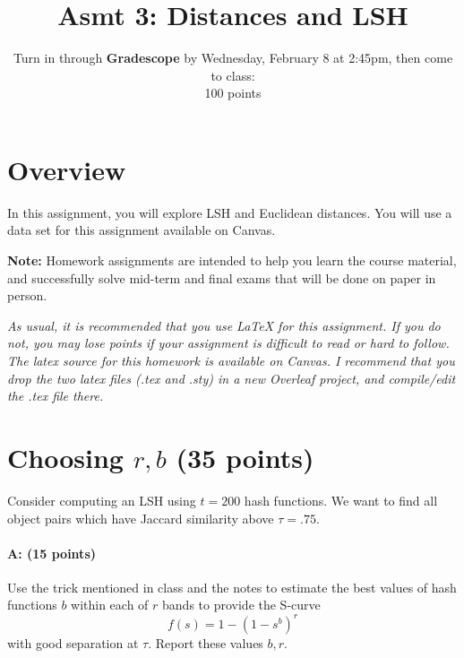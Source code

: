 \documentclass[11pt]{article}
\title{Asmt 3: Distances and LSH}
\author{Turn in through \textbf{Gradescope} by Wednesday, February 8 at 2:45pm, then come to class: \\
100 points}
\date{}
\begin{document}
\maketitle





\section*{Overview}

In this assignment, you will explore LSH and Euclidean distances. You will use a data set for this assignment available on Canvas. 

\vspace{.1in}

\textbf{Note:} Homework assignments are intended to help you learn the course material, and successfully solve mid-term and final exams that will be done on paper in person.   

\vspace{.1in}

\emph{As usual, it is recommended that you use LaTeX for this assignment.  If you do not, you may lose points if your assignment is difficult to read or hard to follow.  The latex source for this homework is available on Canvas. I recommend that you drop the two latex files (.tex and .sty) in a new Overleaf project, and compile/edit the .tex file there.}



\section{Choosing $r,b$ (35 points)}

Consider computing an LSH using $t = 200$ hash functions.  We want to find all object pairs which have Jaccard similarity above $\tau = .75$.  

\paragraph{A: (15 points)} 
Use the trick mentioned in class and the notes to estimate the best values of hash functions $b$ within each of $r$ bands to provide the S-curve 
\[
f(s) = 1- (1-s^b)^r
\]
with good separation at $\tau$.  Report these values $b,r$.  
\end{document}
